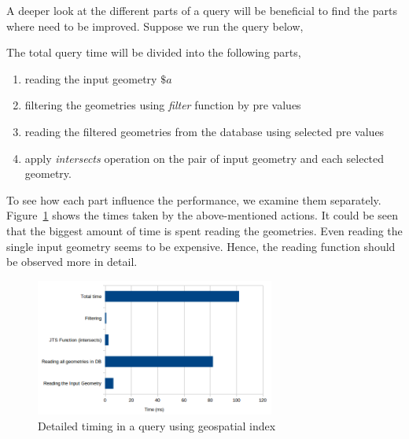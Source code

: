 \documentclass[a4paper,12pt]{article}
\begin{document}
A deeper look at the different parts of a query will be beneficial to find the parts where need to be improved. Suppose we run the query below,
\vspace{10px}
\vspace{10px}
The total query time will be divided into the following parts,

\begin{enumerate}
\item reading the input geometry $\$a$
\item filtering the geometries using \textit{filter} function by pre values 
\item reading the filtered geometries from the database using selected pre values
\item apply \textit{intersects} operation on the pair of input geometry and each selected geometry.
\end{enumerate}

To see how each part influence the performance, we examine them separately. Figure~\ref{figDetailedTiming} shows the times taken by the above-mentioned actions. It could be seen that the biggest amount of time is spent reading the geometries. Even reading the single input geometry seems to be expensive. Hence, the reading function should be observed more in detail.

\begin{figure}
\centering
\includegraphics[width=0.7\textwidth,height=0.2\textheight]{detailedTiming}
\caption{Detailed timing in a query using geospatial index}
\label{figDetailedTiming}
\end{figure}
\end{document}
